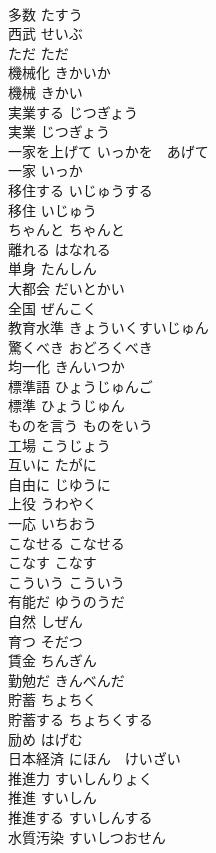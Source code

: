 \documentclass[8pt]{extreport}
\begin{document}
\begin{CJK}{UTF8}{min}
\\	多数	たすう	
\\	西武	せいぶ	
\\	ただ	ただ	
\\	機械化	きかいか	
\\	機械	きかい	
\\	実業する	じつぎょう	
\\	実業	じつぎょう	
\\	一家を上げて	いっかを　あげて	
\\	一家	いっか	
\\	移住する	いじゅうする	
\\	移住	いじゅう	
\\	ちゃんと	ちゃんと	
\\	離れる	はなれる	
\\	単身	たんしん	
\\	大都会	だいとかい	
\\	全国	ぜんこく	
\\	教育水準	きょういくすいじゅん	
\\	驚くべき	おどろくべき	
\\	均一化	きんいつか	
\\	標準語	ひょうじゅんご	
\\	標準	ひょうじゅん	
\\	ものを言う	ものをいう	
\\	工場	こうじょう	
\\	互いに	たがに	
\\	自由に	じゆうに	
\\	上役	うわやく	
\\	一応	いちおう	
\\	こなせる	こなせる	
\\	こなす	こなす	
\\	こういう	こういう	
\\	有能だ	ゆうのうだ	
\\	自然	しぜん	
\\	育つ	そだつ	
\\	賃金	ちんぎん	
\\	勤勉だ	きんべんだ	
\\	貯蓄	ちょちく	
\\	貯蓄する	ちょちくする	
\\	励め	はげむ	
\\	日本経済	にほん　けいざい	
\\	推進力	すいしんりょく	
\\	推進	すいしん	
\\	推進する	すいしんする	
\\	水質汚染	すいしつおせん	

\end{CJK}
\end{document}
